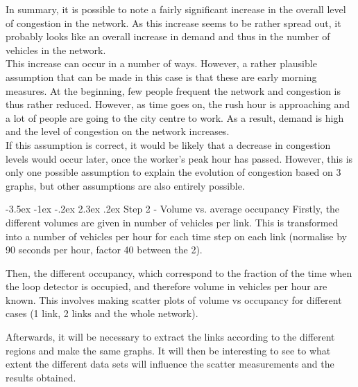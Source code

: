 \documentclass[a4paper, 12pt,oneside]{article}
\makeatletter
\renewcommand{\section}{\@startsection {section}{1}{\z@}%
             {-3.5ex \@plus -1ex \@minus -.2ex}%
             {2.3ex \@plus.2ex}%
             {\normalfont\normalsize\bfseries}}
\makeatother
\begin{document}
In summary, it is possible to note a fairly significant increase in the overall level of congestion in the network. As this increase seems to be rather spread out, it probably looks like an overall increase in demand and thus in the number of vehicles in the network.\\
This increase can occur in a number of ways. However, a rather plausible assumption that can be made in this case is that these are early morning measures. At the beginning, few people frequent the network and congestion is thus rather reduced. However, as time goes on, the rush hour is approaching and a lot of people are going to the city centre to work. As a result, demand is high and the level of congestion on the network increases. \\
If this assumption is correct, it would be likely that a decrease in congestion levels would occur later, once the worker's peak hour has passed. However, this is only one possible assumption to explain the evolution of congestion based on 3 graphs, but other assumptions are also entirely possible.

\bigbreak
\bigbreak
\bigbreak

\section{Step 2 - Volume vs. average occupancy}
Firstly, the different volumes are given in number of vehicles per link. This is transformed into a number of vehicles per hour for each time step on each link (normalise by 90 seconds per hour, factor 40 between the 2).

Then, the different occupancy, which correspond to the fraction of the time when the loop detector is occupied, and therefore volume in vehicles per hour are known. This involves making scatter plots of volume vs occupancy for different cases (1 link, 2 links and the whole network). 

Afterwards, it will be necessary to extract the links according to the different regions and make the same graphs. It will then be interesting to see to what extent the different data sets will influence the scatter measurements and the results obtained.\\ 
\end{document}
